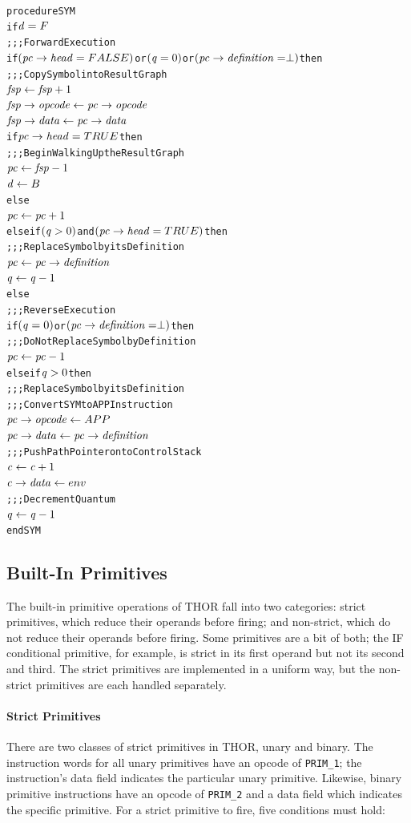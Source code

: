 
\begin{alltt}
procedure SYM
  if \(\rt{d} = F\)
    ;;; Forward Execution
    if \((\rtfield{pc}{head} = FALSE)\) or \((\rt{q} = 0)\) or \((\rtfield{pc}{definition} = \perp)\) then
      ;;; Copy Symbol into Result Graph
      \(\rt{fsp} \leftarrow \rt{fsp}+1\)
      \(\rtfield{fsp}{opcode} \leftarrow \rtfield{pc}{opcode}\)
      \(\rtfield{fsp}{data} \leftarrow \rtfield{pc}{data}\)
      if \(\rtfield{pc}{head} = TRUE\) then
        ;;; Begin Walking Up the Result Graph
        \(\rt{pc} \leftarrow \rt{fsp}-1\)
        \(\rt{d} \leftarrow B\)
      else
        \(\rt{pc} \leftarrow \rt{pc}+1\)
    else if \((\rt{q} > 0)\) and \((\rtfield{pc}{head} = TRUE)\) then
      ;;; Replace Symbol by its Definition
      \(\rt{pc} \leftarrow \rtfield{pc}{definition}\)
      \(\rt{q} \leftarrow \rt{q}-1\)
  else
    ;;; Reverse Execution
    if \((\rt{q} = 0)\) or \((\rtfield{pc}{definition} = \perp)\) then
      ;;; Do Not Replace Symbol by Definition
      \(\rt{pc} \leftarrow \rt{pc}-1\)
    else if \(\rt{q} > 0\) then
      ;;; Replace Symbol by its Definition
      ;;; Convert SYM to APP Instruction
      \(\rtfield{pc}{opcode} \leftarrow APP\)
      \(\rtfield{pc}{data} \leftarrow \rtfield{pc}{definition}\)
      ;;; Push Path Pointer onto Control Stack
      \(\rt{c} \leftarrow \rt{c}+1\)
      \(\rtfield{c}{data} \leftarrow env\)
      ;;; Decrement Quantum
      \(\rt{q} \leftarrow \rt{q}-1\)
end SYM
\end{alltt}

\subsection{Built-In Primitives}

The built-in primitive operations of THOR fall into two categories: strict primitives, which reduce their operands before firing; and non-strict, which do not reduce their operands before firing. Some primitives are a bit of both; the IF conditional primitive, for example, is strict in its first operand but not its second and third. The strict primitives are implemented in a uniform way, but the non-strict primitives are each handled separately.


\paragraph{Strict Primitives}
There are two classes of strict primitives in THOR, unary and binary. The instruction
words for all unary primitives have an opcode of \texttt{PRIM\_1}; the instruction's data
field indicates the particular unary primitive. Likewise, binary primitive instructions
have an opcode of \texttt{PRIM\_2} and a data field which indicates the specific primitive.
For a strict primitive to fire, five conditions must hold:

